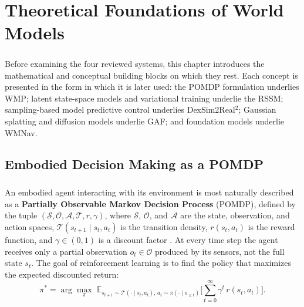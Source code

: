 \documentclass[12pt,a4paper,final]{extreport}
\begin{document}
\chapter{Theoretical Foundations of World Models}

\paragraph{} Before examining the four reviewed systems, this chapter introduces the mathematical and conceptual building blocks on which they rest. Each concept is presented in the form in which it is later used: the POMDP formulation underlies WMP; latent state-space models and variational training underlie the RSSM; sampling-based model predictive control underlies DexSim2Real$^2$; Gaussian splatting and diffusion models underlie GAF; and foundation models underlie WMNav.

\section{Embodied Decision Making as a POMDP}

\paragraph{} An embodied agent interacting with its environment is most naturally described as a \textbf{Partially Observable Markov Decision Process} (POMDP), defined by the tuple $(\mathcal{S}, \mathcal{O}, \mathcal{A}, \mathcal{T}, r, \gamma)$, where $\mathcal{S}$, $\mathcal{O}$, and $\mathcal{A}$ are the state, observation, and action spaces, $\mathcal{T}(s_{t+1}\mid s_t,a_t)$ is the transition density, $r(s_t,a_t)$ is the reward function, and $\gamma\in(0,1)$ is a discount factor \cite{p3}. At every time step the agent receives only a partial observation $o_t\in\mathcal{O}$ produced by its sensors, not the full state $s_t$. The goal of reinforcement learning is to find the policy that maximizes the expected discounted return:
\begin{equation}
\pi^{*} = \arg\max_{\pi}\; \mathbb{E}_{s_{t+1}\sim\mathcal{T}(\cdot\mid s_t,a_t),\,a_t\sim\pi(\cdot\mid o_{\le t})}\Big[\sum_{t=0}^{\infty}\gamma^{t}\, r(s_t,a_t)\Big].
\label{eq:pomdp}
\end{equation}
\end{document}
